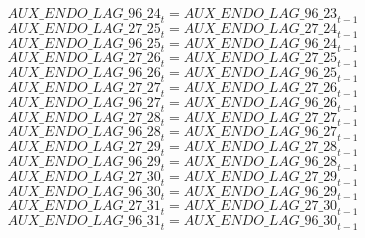 \begin{dmath}
{AUX\_ENDO\_LAG\_96\_24}_{t}={AUX\_ENDO\_LAG\_96\_23}_{t-1}
\end{dmath}
\begin{dmath}
{AUX\_ENDO\_LAG\_27\_25}_{t}={AUX\_ENDO\_LAG\_27\_24}_{t-1}
\end{dmath}
\begin{dmath}
{AUX\_ENDO\_LAG\_96\_25}_{t}={AUX\_ENDO\_LAG\_96\_24}_{t-1}
\end{dmath}
\begin{dmath}
{AUX\_ENDO\_LAG\_27\_26}_{t}={AUX\_ENDO\_LAG\_27\_25}_{t-1}
\end{dmath}
\begin{dmath}
{AUX\_ENDO\_LAG\_96\_26}_{t}={AUX\_ENDO\_LAG\_96\_25}_{t-1}
\end{dmath}
\begin{dmath}
{AUX\_ENDO\_LAG\_27\_27}_{t}={AUX\_ENDO\_LAG\_27\_26}_{t-1}
\end{dmath}
\begin{dmath}
{AUX\_ENDO\_LAG\_96\_27}_{t}={AUX\_ENDO\_LAG\_96\_26}_{t-1}
\end{dmath}
\begin{dmath}
{AUX\_ENDO\_LAG\_27\_28}_{t}={AUX\_ENDO\_LAG\_27\_27}_{t-1}
\end{dmath}
\begin{dmath}
{AUX\_ENDO\_LAG\_96\_28}_{t}={AUX\_ENDO\_LAG\_96\_27}_{t-1}
\end{dmath}
\begin{dmath}
{AUX\_ENDO\_LAG\_27\_29}_{t}={AUX\_ENDO\_LAG\_27\_28}_{t-1}
\end{dmath}
\begin{dmath}
{AUX\_ENDO\_LAG\_96\_29}_{t}={AUX\_ENDO\_LAG\_96\_28}_{t-1}
\end{dmath}
\begin{dmath}
{AUX\_ENDO\_LAG\_27\_30}_{t}={AUX\_ENDO\_LAG\_27\_29}_{t-1}
\end{dmath}
\begin{dmath}
{AUX\_ENDO\_LAG\_96\_30}_{t}={AUX\_ENDO\_LAG\_96\_29}_{t-1}
\end{dmath}
\begin{dmath}
{AUX\_ENDO\_LAG\_27\_31}_{t}={AUX\_ENDO\_LAG\_27\_30}_{t-1}
\end{dmath}
\begin{dmath}
{AUX\_ENDO\_LAG\_96\_31}_{t}={AUX\_ENDO\_LAG\_96\_30}_{t-1}
\end{dmath}
